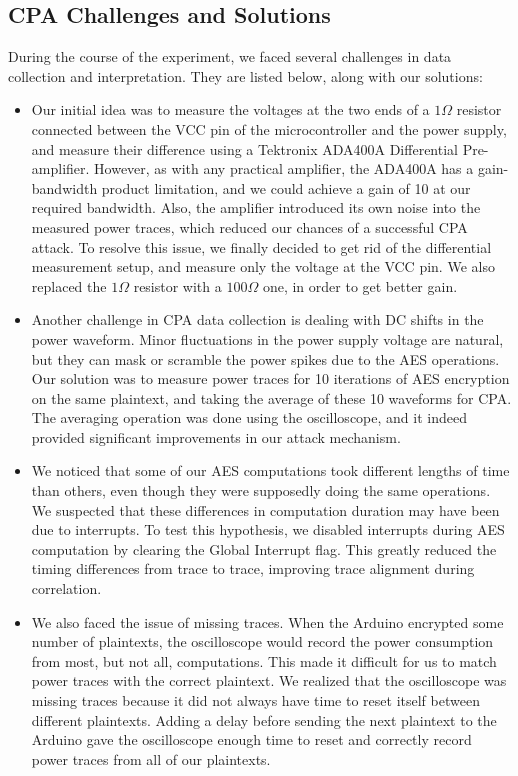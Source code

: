 \documentclass[journal]{ieee_style}
\begin{document}
\subsection{CPA Challenges and Solutions}
During the course of the experiment, we faced several challenges in data collection and interpretation. They are listed below, along with our solutions:
\begin{itemize}
\item Our initial idea was to measure the voltages at the two ends of a $1\Omega$ resistor connected between the VCC pin of the microcontroller and the power supply, and measure their difference using a Tektronix ADA400A Differential Pre-amplifier. However, as with any practical amplifier, the ADA400A has a gain-bandwidth product limitation, and we could achieve a gain of 10 at our required bandwidth. Also, the amplifier introduced its own noise into the measured power traces, which reduced our chances of a successful CPA attack. To resolve this issue, we finally decided to get rid of the differential measurement setup, and measure only the voltage at the VCC pin. We also replaced the $1\Omega$ resistor with a $100\Omega$ one, in order to get better gain.
\item Another challenge in CPA data collection is dealing with DC shifts in the power waveform. Minor fluctuations in the power supply voltage are natural, but they can mask or scramble the power spikes due to the AES operations. Our solution was to measure power traces for 10 iterations of AES encryption on the same plaintext, and taking the average of these 10 waveforms for CPA. The averaging operation was done using the oscilloscope, and it indeed provided significant improvements in our attack mechanism.
\item We noticed that some of our AES computations took different lengths of time than others, even though they were supposedly doing the same operations. We suspected that these differences in computation duration may have been due to interrupts. To test this hypothesis, we disabled interrupts during AES computation by clearing the Global Interrupt flag. This greatly reduced the timing differences from trace to trace, improving trace alignment during correlation.
\item We also faced the issue of missing traces. When the Arduino encrypted some number of plaintexts, the oscilloscope would record the power consumption from most, but not all, computations. This made it difficult for us to match power traces with the correct plaintext. We realized that the oscilloscope was missing traces because it did not always have time to reset itself between different plaintexts. Adding a delay before sending the next plaintext to the Arduino gave the oscilloscope enough time to reset and correctly record power traces from all of our plaintexts.

\end{itemize}
\end{document}
